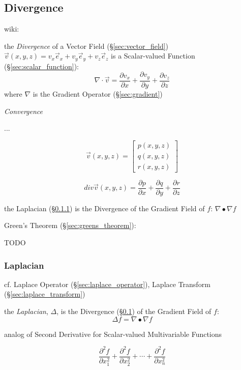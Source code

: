 \subsection{Divergence}\label{sec:divergence}

wiki:

the \emph{Divergence} of a Vector Field (\S\ref{sec:vector_field})
$\vec{v}(x,y,z) = v_x\vec{e}_x + v_y\vec{e}_y + v_z\vec{e}_z$ is a
Scalar-valued Function (\S\ref{sec:scalar_function}):
\[
  \nabla \cdot \vec{v} =
    \frac{\partial v_x}{\partial x} +
    \frac{\partial v_y}{\partial y} +
    \frac{\partial v_z}{\partial z}
\]
where $\nabla$ is the Gradient Operator (\S\ref{sec:gradient})

\emph{Convergence}

...

\[
  \vec{v}(x,y,z) = \begin{bmatrix}
    p(x,y,z) \\
    q(x,y,z) \\
    r(x,y,z)
  \end{bmatrix}
\]

\[
  div\vec{v}(x,y,z)
    = \frac{\partial{p}}{\partial{x}}
    + \frac{\partial{q}}{\partial{y}}
    + \frac{\partial{r}}{\partial{z}}
\]

the Laplacian (\S\ref{sec:laplacian}) is the Divergence of the Gradient Field
of $f$: $\nabla \bullet \nabla f$

Green's Theorem (\S\ref{sec:greens_theorem}):

TODO



\subsubsection{Laplacian}\label{sec:laplacian}

\fist cf. Laplace Operator (\S\ref{sec:laplace_operator}), Laplace Transform
(\S\ref{sec:laplace_transform}) %

the \emph{Laplacian}, $\Delta$, is the Divergence (\S\ref{sec:divergence}) of
the Gradient Field of $f$:
\[
  \Delta f = \nabla \bullet \nabla f
\]

analog of Second Derivative for Scalar-valued Multivariable Functions

\[
  \frac{\partial^2 f}{\partial{x_1^2}} +
  \frac{\partial^2 f}{\partial{x_2^2}} +
  \cdots +
  \frac{\partial^2 f}{\partial{x_n^2}}
\]

